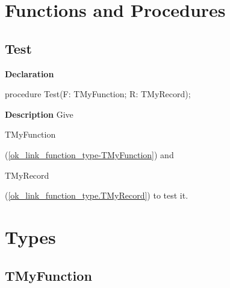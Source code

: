 \documentclass{report}
\newif\ifpdf
\begin{document}
\section{Functions and Procedures}
\ifpdf
\subsection*{\large{\textbf{Test}}\normalsize\hspace{1ex}\hrulefill}
\else
\subsection*{Test}
\fi
\label{ok_link_function_type-Test}
\begin{list}{}{
\setlength{\itemindent}{0cm}
\setlength{\listparindent}{0cm}
\setlength{\leftmargin}{\evensidemargin}
\addtolength{\leftmargin}{\tmplength}
\settowidth{\labelsep}{X}
\addtolength{\leftmargin}{\labelsep}
\setlength{\labelwidth}{\tmplength}
}
\item[\textbf{Declaration}\hfill]
\ifpdf
\begin{flushleft}
\fi
\begin{ttfamily}
procedure Test(F: TMyFunction; R: TMyRecord);\end{ttfamily}

\ifpdf
\end{flushleft}
\fi

\par
\item[\textbf{Description}]
Give \begin{ttfamily}TMyFunction\end{ttfamily}(\ref{ok_link_function_type-TMyFunction}) and \begin{ttfamily}TMyRecord\end{ttfamily}(\ref{ok_link_function_type.TMyRecord}) to test it.

\end{list}
\section{Types}
\ifpdf
\subsection*{\large{\textbf{TMyFunction}}\normalsize\hspace{1ex}\hrulefill}
\else
\end{document}
